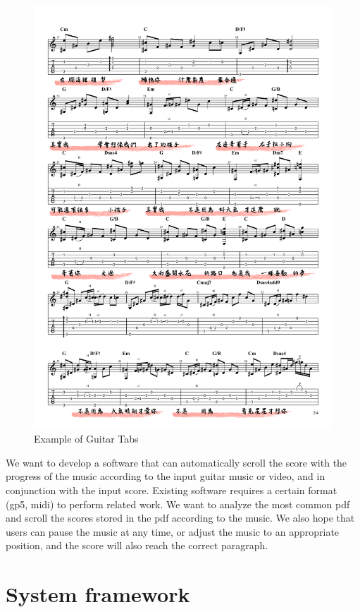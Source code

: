 \documentclass[10pt,twocolumn,letterpaper]{article}
\begin{document}
\begin{CJK}{UTF8}{bsmi}
\begin{figure}[t]
\begin{center}
   \includegraphics[width=0.8\linewidth]{2.png}
\end{center}
   \caption{Example of Guitar Tabs}
\label{fig:long}
\label{fig:guitar}
\end{figure}

We want to develop a software that can automatically scroll the score with the progress of the music according to the input guitar music or video, and in conjunction with the input score. Existing software requires a certain format (gp5, midi) to perform related work. We want to analyze the most common pdf and scroll the scores stored in the pdf according to the music. We also hope that users can pause the music at any time, or adjust the music to an appropriate position, and the score will also reach the correct paragraph.

\section{System framework}


\end{CJK}
\end{document}
